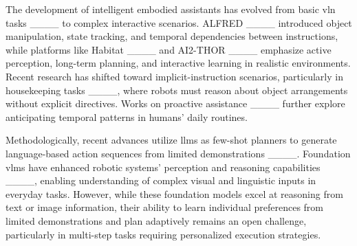 The development of intelligent embodied assistants has evolved from basic \ac{vln} tasks ____ to complex interactive scenarios. ALFRED ____ introduced object manipulation, state tracking, and temporal dependencies between instructions, while platforms like Habitat ____ and AI2-THOR ____ emphasize active perception, long-term planning, and interactive learning in realistic environments. Recent research has shifted toward implicit-instruction scenarios, particularly in housekeeping tasks ____, where robots must reason about object arrangements without explicit directives. Works on proactive assistance ____ further explore anticipating temporal patterns in humans' daily routines.

Methodologically, recent advances utilize \acp{llm} as few-shot planners to generate language-based action sequences from limited demonstrations ____. Foundation \acp{vlm} have enhanced robotic systems' perception and reasoning capabilities ____, enabling understanding of complex visual and linguistic inputs in everyday tasks. However, while these foundation models excel at reasoning from text or image information, their ability to learn individual preferences from limited demonstrations and plan adaptively remains an open challenge, particularly in multi-step tasks requiring personalized execution strategies.